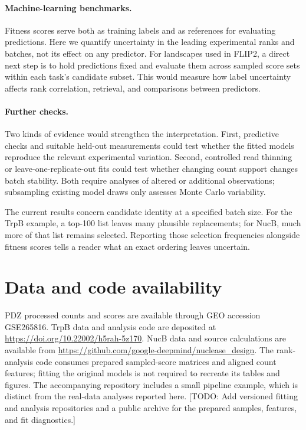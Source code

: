 \documentclass[11pt]{article}
\newcommand{\note}[1]{\textcolor{boxrule}{\small[#1]}}
\begin{document}
\paragraph{Machine-learning benchmarks.}
Fitness scores serve both as training labels and as references for
evaluating predictions. Here we quantify uncertainty in the leading
experimental ranks and batches, not its effect on any predictor. For
landscapes used in FLIP2, a direct next step is to hold predictions fixed
and evaluate them across sampled score sets within each task's candidate
subset. This would measure how label uncertainty affects rank correlation,
retrieval, and comparisons between predictors.

\paragraph{Further checks.}
Two kinds of evidence would strengthen the interpretation. First, predictive
checks and suitable held-out measurements could test whether the fitted
models reproduce the relevant experimental variation. Second, controlled
read thinning or leave-one-replicate-out fits could test whether changing
count support changes batch stability. Both require analyses of altered
or additional observations; subsampling existing model draws only assesses
Monte Carlo variability.

The current results concern candidate identity at a specified batch size.
For the TrpB example, a top-100 list leaves many plausible replacements;
for NucB, much more of that list remains selected. Reporting those
selection frequencies alongside fitness scores tells a reader what an
exact ordering leaves uncertain.

\section*{Data and code availability}
PDZ processed counts and scores are available through GEO accession GSE265816.
TrpB data and analysis code are deposited at
\url{https://doi.org/10.22002/h5rah-5z170}. NucB data and source calculations
are available from \url{https://github.com/google-deepmind/nuclease_design}.
The rank-analysis code consumes prepared sampled-score matrices and aligned
count features; fitting the original models is not required to recreate its
tables and figures. The accompanying repository includes a small pipeline
example, which is distinct from the real-data analyses reported here.
\note{TODO: Add versioned fitting and analysis repositories and a public archive
for the prepared samples, features, and fit diagnostics.}
\end{document}
